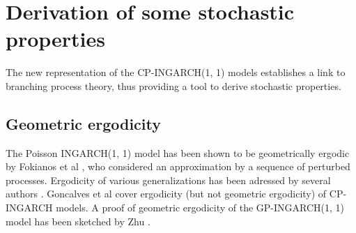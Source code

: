 \documentclass[review]{elsarticle}
\begin{document}
\section{Derivation of some stochastic properties}

The new representation of the CP-INGARCH(1, 1) models establishes a link to branching process theory, thus providing a tool to derive stochastic properties.

\subsection{Geometric ergodicity}

The Poisson INGARCH(1, 1) model has been shown to be geometrically ergodic by Fokianos et al \cite{Fokianos2009}, who considered an approximation by a sequence of perturbed processes. Ergodicity of various generalizations has been adressed by several authors \citep{Davis2016, Douc2013, Neumann2011}. Goncalves et al \citep{Goncalves2015} cover ergodicity (but not geometric ergodicity) of CP-INGARCH models. A proof of geometric ergodicity of the GP-INGARCH(1, 1) model has been sketched by Zhu \citep{Zhu2012}. %
\end{document}
